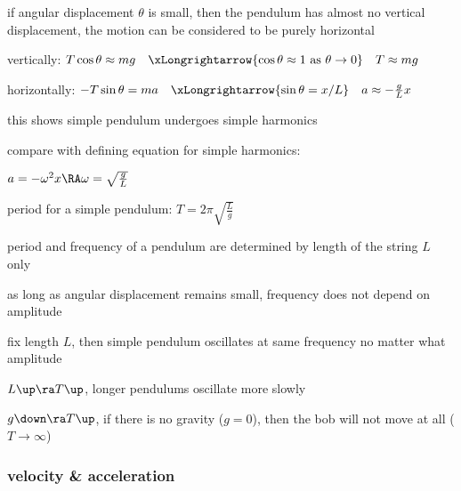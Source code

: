 if angular displacement $\theta$ is small, then the pendulum has almost no vertical displacement, the motion can be considered to be purely horizontal
		
vertically: $T\cos\theta \approx mg \quad \xLongrightarrow{\cos\theta\approx1 \text{ as } \theta\to0} \quad T\approx mg$
		
horizontally: $-T\sin\theta = ma \quad \xLongrightarrow{\sin\theta=x/L} \quad a \approx -\frac{g}{L}x$

this shows simple pendulum undergoes simple harmonics
	
compare with defining equation for simple harmonics:

{

\centering

$a=-\omega^2x \RA \omega = \sqrt{\frac{g}{L}}$

}
	
period for a simple pendulum: $\boxed{T= 2\pi\sqrt{\frac{L}{g}}}$

\cmt period and frequency of a pendulum are determined by length of the string $L$ only

as long as angular displacement remains small, frequency does not depend on amplitude

fix length $L$, then simple pendulum oscillates at same frequency no matter what amplitude

\cmt $L \up \ra T \up$, longer pendulums oscillate more slowly

\cmt $g \down \ra T \up$, if there is no gravity ($g=0$), then the bob will not move at all  ($T\to \infty$)





\subsubsection{velocity \& acceleration}

